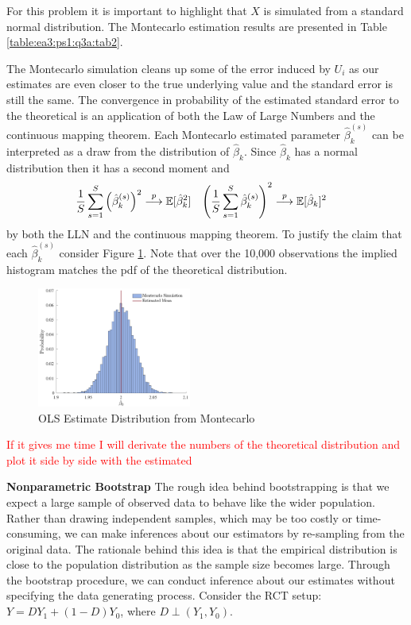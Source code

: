 \documentclass{article}
\begin{document}
\begin{solution}
For this problem it is important to highlight that $X$ is simulated from a standard normal distribution. The Montecarlo estimation results are presented in Table \ref{table:ea3:ps1:q3a:tab2}. 

The Montecarlo simulation cleans up some of the error induced by $U_i$ as our estimates are even closer to the true underlying value and the standard error is still the same. The convergence in probability of the estimated standard error to the theoretical is an application of both the Law of Large Numbers and the continuous mapping theorem. Each Montecarlo estimated parameter $\hat{\beta}_k^{(s)}$ can be interpreted as a draw from the distribution of $\hat{\beta}_k$. Since $\hat{\beta}_k$ has a normal distribution then it has a second moment and 
\begin{align*}
    \frac{1}{S} \sum_{s=1}^{S}\left(\hat{\beta}_{k}^{(s)}\right)^{2}&\stackrel{p}{\longrightarrow}  \mathbb{E}[\hat{\beta}_k^2] & 
    \left(\frac{1}{S} \sum_{s=1}^{S} \hat{\beta}_{k}^{(s)}\right)^{2}&\stackrel{p}{\longrightarrow} \mathbb{E}[\hat{\beta}_k]^2
\end{align*}
by both the LLN and the continuous mapping theorem. To justify the claim that each $\hat{\beta}_k^{(s)}$ consider Figure \ref{ea3:ps1:q3a:fig1}. Note that over the 10,000 observations the implied histogram matches the pdf of the theoretical distribution. 
\begin{figure}[htb]
    \centering
    \caption{OLS Estimate Distribution from Montecarlo}
    \label{ea3:ps1:q3a:fig1}
    \includegraphics[width=0.45\textwidth]{Figures/p3qa.pdf}
\end{figure}
\textcolor{red}{If it gives me time I will derivate the numbers of the theoretical distribution and plot it side by side with the estimated}
\end{solution}
\FloatBarrier
\underline{\hspace{\textwidth}}
\textbf{Nonparametric Bootstrap}
The rough idea behind bootstrapping is that we expect a large sample of observed data to behave like the wider population. Rather than drawing independent samples, which may be too costly or time-consuming, we can make inferences about our estimators by re-sampling from the original data. The rationale behind this idea is that the empirical distribution is close to the population distribution as the sample size becomes large. Through the bootstrap procedure, we can conduct inference about our estimates without specifying the data generating process. Consider the RCT setup: $Y=D Y_{1}+(1-D) Y_{0}$, where $D \perp\left(Y_{1}, Y_{0}\right)$.
\end{document}
